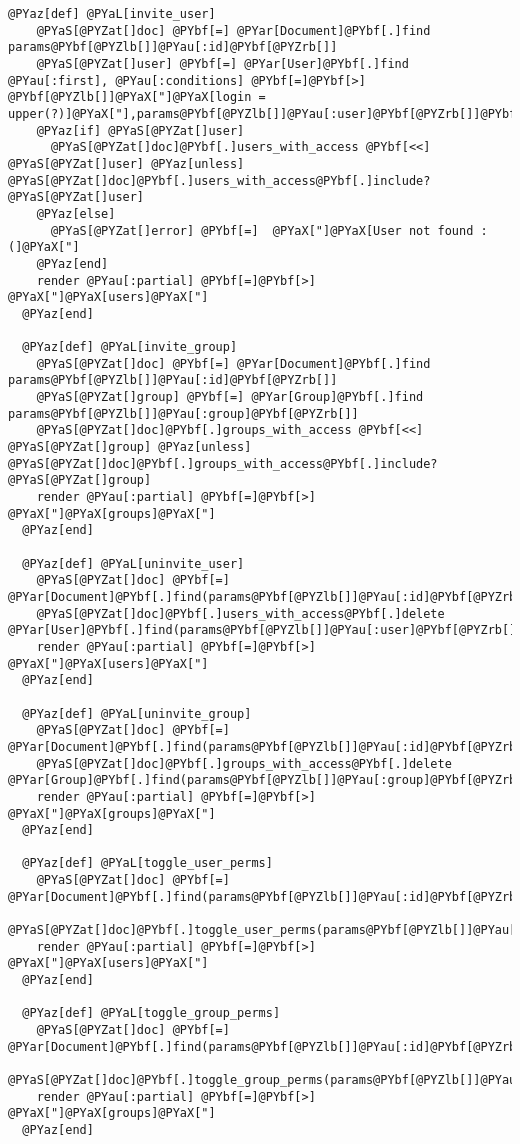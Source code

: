 \begin{Verbatim}[commandchars=@\[\]]
  @PYaz[def] @PYaL[invite_user]
    @PYaS[@PYZat[]doc] @PYbf[=] @PYar[Document]@PYbf[.]find params@PYbf[@PYZlb[]]@PYau[:id]@PYbf[@PYZrb[]]
    @PYaS[@PYZat[]user] @PYbf[=] @PYar[User]@PYbf[.]find @PYau[:first], @PYau[:conditions] @PYbf[=]@PYbf[>] @PYbf[@PYZlb[]]@PYaX["]@PYaX[login = upper(?)]@PYaX["],params@PYbf[@PYZlb[]]@PYau[:user]@PYbf[@PYZrb[]]@PYbf[.]upcase@PYbf[@PYZrb[]]
    @PYaz[if] @PYaS[@PYZat[]user]
      @PYaS[@PYZat[]doc]@PYbf[.]users_with_access @PYbf[<<] @PYaS[@PYZat[]user] @PYaz[unless] @PYaS[@PYZat[]doc]@PYbf[.]users_with_access@PYbf[.]include? @PYaS[@PYZat[]user]
    @PYaz[else]
      @PYaS[@PYZat[]error] @PYbf[=]  @PYaX["]@PYaX[User not found :(]@PYaX["]
    @PYaz[end]
    render @PYau[:partial] @PYbf[=]@PYbf[>] @PYaX["]@PYaX[users]@PYaX["]
  @PYaz[end]
  
  @PYaz[def] @PYaL[invite_group]
    @PYaS[@PYZat[]doc] @PYbf[=] @PYar[Document]@PYbf[.]find params@PYbf[@PYZlb[]]@PYau[:id]@PYbf[@PYZrb[]]
    @PYaS[@PYZat[]group] @PYbf[=] @PYar[Group]@PYbf[.]find params@PYbf[@PYZlb[]]@PYau[:group]@PYbf[@PYZrb[]]
    @PYaS[@PYZat[]doc]@PYbf[.]groups_with_access @PYbf[<<] @PYaS[@PYZat[]group] @PYaz[unless] @PYaS[@PYZat[]doc]@PYbf[.]groups_with_access@PYbf[.]include? @PYaS[@PYZat[]group]
    render @PYau[:partial] @PYbf[=]@PYbf[>] @PYaX["]@PYaX[groups]@PYaX["]
  @PYaz[end]
  
  @PYaz[def] @PYaL[uninvite_user]
    @PYaS[@PYZat[]doc] @PYbf[=] @PYar[Document]@PYbf[.]find(params@PYbf[@PYZlb[]]@PYau[:id]@PYbf[@PYZrb[]])
    @PYaS[@PYZat[]doc]@PYbf[.]users_with_access@PYbf[.]delete @PYar[User]@PYbf[.]find(params@PYbf[@PYZlb[]]@PYau[:user]@PYbf[@PYZrb[]])    
    render @PYau[:partial] @PYbf[=]@PYbf[>] @PYaX["]@PYaX[users]@PYaX["]
  @PYaz[end]
  
  @PYaz[def] @PYaL[uninvite_group]
    @PYaS[@PYZat[]doc] @PYbf[=] @PYar[Document]@PYbf[.]find(params@PYbf[@PYZlb[]]@PYau[:id]@PYbf[@PYZrb[]])
    @PYaS[@PYZat[]doc]@PYbf[.]groups_with_access@PYbf[.]delete @PYar[Group]@PYbf[.]find(params@PYbf[@PYZlb[]]@PYau[:group]@PYbf[@PYZrb[]])
    render @PYau[:partial] @PYbf[=]@PYbf[>] @PYaX["]@PYaX[groups]@PYaX["]
  @PYaz[end]
  
  @PYaz[def] @PYaL[toggle_user_perms]
    @PYaS[@PYZat[]doc] @PYbf[=] @PYar[Document]@PYbf[.]find(params@PYbf[@PYZlb[]]@PYau[:id]@PYbf[@PYZrb[]])
    @PYaS[@PYZat[]doc]@PYbf[.]toggle_user_perms(params@PYbf[@PYZlb[]]@PYau[:user]@PYbf[@PYZrb[]])
    render @PYau[:partial] @PYbf[=]@PYbf[>] @PYaX["]@PYaX[users]@PYaX["]
  @PYaz[end]

  @PYaz[def] @PYaL[toggle_group_perms]
    @PYaS[@PYZat[]doc] @PYbf[=] @PYar[Document]@PYbf[.]find(params@PYbf[@PYZlb[]]@PYau[:id]@PYbf[@PYZrb[]])
    @PYaS[@PYZat[]doc]@PYbf[.]toggle_group_perms(params@PYbf[@PYZlb[]]@PYau[:group]@PYbf[@PYZrb[]])
    render @PYau[:partial] @PYbf[=]@PYbf[>] @PYaX["]@PYaX[groups]@PYaX["]
  @PYaz[end]


\end{Verbatim}
